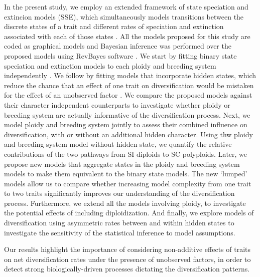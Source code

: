 In the present study, we employ an extended framework of state speciation and extincion models (SSE), which simultaneously models transitions between the discrete states of a trait and different rates of speciation and extinction associated with each of those states \citep{maddison_2007, fitzjohn_2012}.
All the models proposed for this study are coded as graphical models and Bayesian inference was performed over the proposed models using RevBayes software \citep{hoehna_2016}.
We start by fitting binary state speciation and extinction models to each ploidy and breeding system independently \citep{maddison_2007}. We follow by 
fitting models that incorporate hidden states, which reduce the chance that an effect of one trait on diversification would be mistaken for the effect of an unobserved factor \citep{beaulieu_2016}.
We compare the proposed models against their character independent counterparts \citep{beaulieu_2016} to investigate whether ploidy or breeding system are actually informative of the diversification process.
Next, we model ploidy and breeding system jointly to assess their combined influence on diversification, with or without an additional hidden character. Using thw ploidy and breeding system model  without hidden state, we quantify the relative contributions of the two pathways from SI diploids to SC polyploids.
Later, we propose new models that aggregate states in the ploidy and breeding system models to make them equivalent to the binary state models.
The new `lumped' models allow us to compare whether increasing model complexity from one trait to two traits significantly improves our understanding of the diversification process.
%
Furthermore, we extend all the models involving ploidy, to investigate the potential effects of including diploidization.
And finally, we explore models of diversification using asymmetric rates between and within hidden states to investigate the sensitivity of the statistical inference to model assumptions.

Our results highlight the importance of considering non-additive effects of traits on net diversification rates  under the presence of unobserved factors, in order to detect strong biologically-driven processes dictating the diversification patterns.
